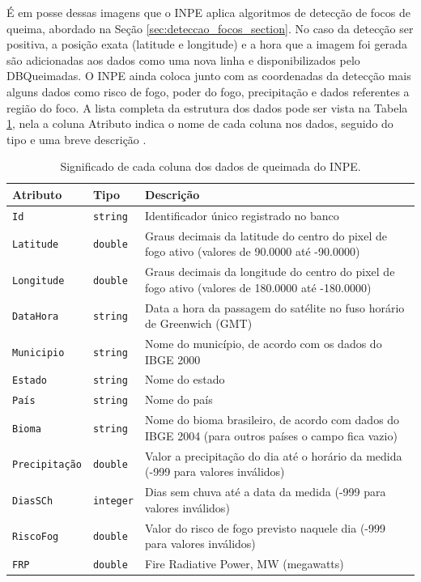 \documentclass[cic,tc]{iiufrgs}
\begin{document}
É em posse dessas imagens que o INPE aplica algoritmos de detecção de focos de queima, abordado na Seção \ref{sec:deteccao_focos_section}. No caso da detecção ser positiva, a posição exata (latitude e longitude) e a hora que a imagem foi gerada são adicionadas aos dados como uma nova linha e disponibilizados pelo DBQueimadas. O INPE ainda coloca junto com as coordenadas da detecção mais alguns dados como risco de fogo, poder do fogo, precipitação e dados referentes a região do foco. A lista completa da estrutura dos dados pode ser vista na Tabela \ref{table:inpeColumns}, nela a coluna Atributo indica o nome de cada coluna nos dados, seguido do tipo e uma breve descrição \cite{PerguntasFrequentesINPE}. \par

\begin{table}[htbp]
\centering
\caption{Significado de cada coluna dos dados de queimada do INPE.}
\begin{tabular}{@{}llp{9cm}@{}}
 \toprule
 \textbf{Atributo} & \textbf{Tipo} & \textbf{Descrição} \\
 \midrule
 \texttt{Id} & \texttt{string} & Identificador único registrado no banco \\
 \texttt{Latitude} & \texttt{double} & Graus decimais da latitude do centro 
                     do pixel de fogo ativo (valores de 90.0000 até -90.0000) \\ 
 \texttt{Longitude} & \texttt{double} & Graus decimais da longitude do centro 
                     do pixel de fogo ativo (valores de 180.0000 até -180.0000) \\  
 \texttt{DataHora} & \texttt{string} & Data a hora da passagem do satélite no fuso 
                     horário de Greenwich (GMT) \\   
 \texttt{Municipio} & \texttt{string} & Nome do município, de acordo com os dados 
                     do IBGE 2000 \\
 \texttt{Estado} & \texttt{string} & Nome do estado \\
 \texttt{País} & \texttt{string} & Nome do país \\  
 \texttt{Bioma} & \texttt{string} & Nome do bioma brasileiro, de acordo com 
                     dados do IBGE 2004 (para outros países o campo fica vazio) \\
 \texttt{Precipitação} & \texttt{double} & Valor a precipitação do dia até 
                     o horário da medida (-999 para valores inválidos) \\
 \texttt{DiasSCh} & \texttt{integer} & Dias sem chuva até a data da medida 
                     (-999 para valores inválidos) \\
 \texttt{RiscoFog} & \texttt{double} & Valor do risco de fogo previsto naquele dia 
                     (-999 para valores inválidos) \\
 \texttt{FRP} & \texttt{double} & Fire Radiative Power, MW (megawatts) \\
 \bottomrule
\end{tabular}
\label{table:inpeColumns}
\end{table}
\end{document}
